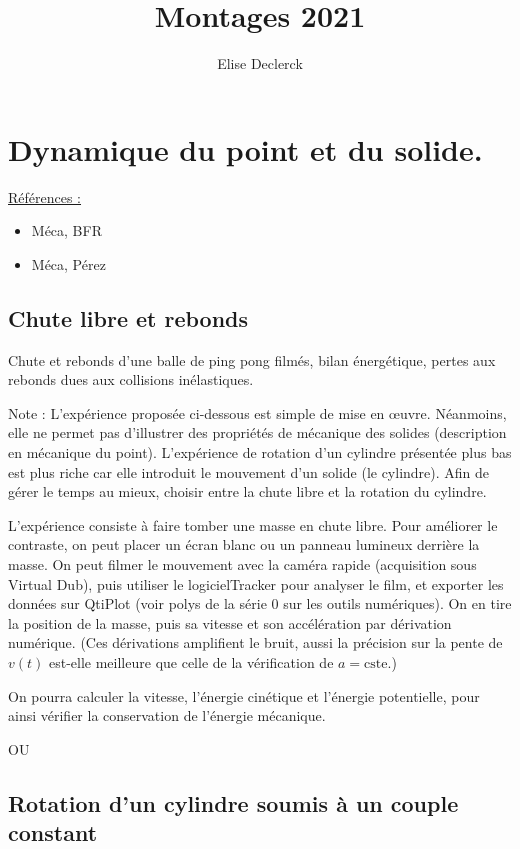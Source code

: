 \documentclass{article}%
\title{Montages 2021}
\author{Elise Declerck}
\begin{document}
\def\labelitemi{-}
\maketitle

\section{Dynamique du point et du solide.}
\underline{Références :}
\begin{itemize}
	\item Méca, BFR
	\item Méca, Pérez
\end{itemize}

\subsection{Chute libre et rebonds}

Chute et rebonds d'une balle de ping pong filmés, bilan énergétique, pertes aux rebonds dues aux collisions inélastiques.

Note : L'expérience proposée ci-dessous est simple de mise en œuvre. Néanmoins, elle ne permet pas d'illustrer des propriétés de mécanique des solides (description en mécanique du point). L'expérience de rotation d'un cylindre présentée plus bas est plus riche car elle introduit le mouvement d'un solide (le cylindre). Afin de gérer le temps au mieux, choisir entre la chute libre et la rotation du cylindre.

L'expérience consiste à faire tomber une masse en chute libre. Pour améliorer le contraste, on peut placer un écran blanc ou un panneau lumineux derrière la masse. On peut filmer le mouvement avec la caméra rapide (acquisition sous Virtual Dub), puis utiliser le logicielTracker pour analyser le film, et exporter les données sur QtiPlot (voir polys de la série 0 sur les outils numériques). On en tire la position de la masse, puis sa vitesse et son accélération par dérivation numérique. (Ces dérivations amplifient le bruit, aussi la précision sur la pente de $v(t)$ est-elle meilleure que celle de la vérification de $ a=\mathrm{cste}$.)

On pourra calculer la vitesse, l'énergie cinétique et l'énergie potentielle, pour ainsi vérifier la conservation de l'énergie mécanique.

OU

\subsection{Rotation d'un cylindre soumis à un couple constant}
\end{document}

